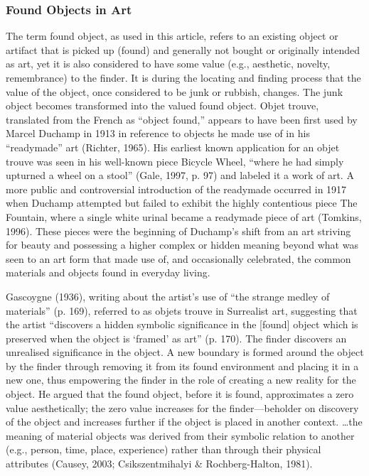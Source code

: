 \subsubsection{Found Objects in Art}
The term found object, as used in this article, refers to an existing object or artifact that is picked up (found) and generally not bought or originally intended as art, yet it is also considered to have some value (e.g., aesthetic, novelty, remembrance) to the finder. It is during the locating and finding process that the value of the object, once considered to be junk or rubbish, changes. The junk object becomes transformed into the valued found object. Objet trouve, translated from the French as “object found,” appears to have been first used by Marcel Duchamp in 1913 in reference to objects he made use of in his “readymade” art (Richter, 1965). His earliest known application for an objet trouve was seen in his well-known piece Bicycle Wheel, “where he had simply upturned a wheel on a stool” (Gale, 1997, p. 97) and labeled it a work of art. A more public and controversial introduction of the readymade occurred in 1917 when Duchamp attempted but failed to exhibit the highly contentious piece The Fountain, where a single white urinal became a readymade piece of art (Tomkins, 1996). These pieces were the beginning of Duchamp’s shift from an art striving for beauty and possessing a higher complex or hidden meaning beyond what was seen to an art form that made use of, and occasionally celebrated, the common materials and objects found in everyday living.

Gascoygne (1936), writing about the artist’s use of “the strange medley of materials” (p. 169), referred to as objets trouve in Surrealist art, suggesting that the artist “discovers a hidden symbolic significance in the [found] object which is preserved when the object is ‘framed’ as art” (p. 170). The finder discovers an unrealised significance in the object. A new boundary is formed around the object by the finder through removing it from its found environment and placing it in a new one, thus empowering the finder in the role of creating a new reality for the object. He argued that the found object, before it is found, approximates a zero value aesthetically; the zero value increases for the finder---beholder on discovery of the object and increases further if the object is placed in another context. \ldots the meaning of material objects was derived from their symbolic relation to another (e.g., person, time, place, experience) rather than through their physical attributes (Causey, 2003; Csikszentmihalyi \& Rochberg-Halton, 1981). 

